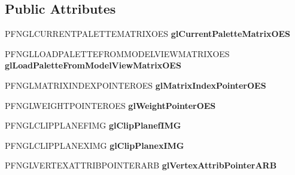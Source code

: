 \subsection*{Public Attributes}
\begin{DoxyCompactItemize}
\item 
\hypertarget{class_c_p_v_r_tgles_ext_a9eed75139805219c0499350e28588be6}{P\+F\+N\+G\+L\+C\+U\+R\+R\+E\+N\+T\+P\+A\+L\+E\+T\+T\+E\+M\+A\+T\+R\+I\+X\+O\+E\+S {\bfseries gl\+Current\+Palette\+Matrix\+O\+E\+S}}\label{class_c_p_v_r_tgles_ext_a9eed75139805219c0499350e28588be6}

\item 
\hypertarget{class_c_p_v_r_tgles_ext_a0542e61d4b1526f942a969c02e5d4bb8}{P\+F\+N\+G\+L\+L\+O\+A\+D\+P\+A\+L\+E\+T\+T\+E\+F\+R\+O\+M\+M\+O\+D\+E\+L\+V\+I\+E\+W\+M\+A\+T\+R\+I\+X\+O\+E\+S {\bfseries gl\+Load\+Palette\+From\+Model\+View\+Matrix\+O\+E\+S}}\label{class_c_p_v_r_tgles_ext_a0542e61d4b1526f942a969c02e5d4bb8}

\item 
\hypertarget{class_c_p_v_r_tgles_ext_a3bfb043b9ff3a87d44f59627240ecbcc}{P\+F\+N\+G\+L\+M\+A\+T\+R\+I\+X\+I\+N\+D\+E\+X\+P\+O\+I\+N\+T\+E\+R\+O\+E\+S {\bfseries gl\+Matrix\+Index\+Pointer\+O\+E\+S}}\label{class_c_p_v_r_tgles_ext_a3bfb043b9ff3a87d44f59627240ecbcc}

\item 
\hypertarget{class_c_p_v_r_tgles_ext_a2f0285e2a7daa3ea1fe0bcbd28226055}{P\+F\+N\+G\+L\+W\+E\+I\+G\+H\+T\+P\+O\+I\+N\+T\+E\+R\+O\+E\+S {\bfseries gl\+Weight\+Pointer\+O\+E\+S}}\label{class_c_p_v_r_tgles_ext_a2f0285e2a7daa3ea1fe0bcbd28226055}

\item 
\hypertarget{class_c_p_v_r_tgles_ext_aa2e162a347f5373c6a68cd0ec6f6cd8b}{P\+F\+N\+G\+L\+C\+L\+I\+P\+P\+L\+A\+N\+E\+F\+I\+M\+G {\bfseries gl\+Clip\+Planef\+I\+M\+G}}\label{class_c_p_v_r_tgles_ext_aa2e162a347f5373c6a68cd0ec6f6cd8b}

\item 
\hypertarget{class_c_p_v_r_tgles_ext_af781d12d08ede3c6bb05df704bd15db0}{P\+F\+N\+G\+L\+C\+L\+I\+P\+P\+L\+A\+N\+E\+X\+I\+M\+G {\bfseries gl\+Clip\+Planex\+I\+M\+G}}\label{class_c_p_v_r_tgles_ext_af781d12d08ede3c6bb05df704bd15db0}

\item 
\hypertarget{class_c_p_v_r_tgles_ext_af1299f0a7f2656aa0705e59e92cce087}{P\+F\+N\+G\+L\+V\+E\+R\+T\+E\+X\+A\+T\+T\+R\+I\+B\+P\+O\+I\+N\+T\+E\+R\+A\+R\+B {\bfseries gl\+Vertex\+Attrib\+Pointer\+A\+R\+B}}\label{class_c_p_v_r_tgles_ext_af1299f0a7f2656aa0705e59e92cce087}


\end{DoxyCompactItemize}
